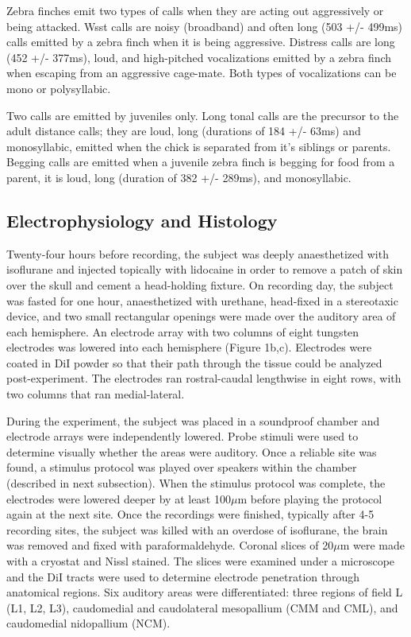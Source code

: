 Zebra finches emit two types of calls when they are acting out aggressively or being attacked. Wsst calls are noisy (broadband) and often long (503 +/- 499ms) calls emitted by a zebra finch when it is being aggressive. Distress calls are long (452 +/- 377ms), loud, and high-pitched vocalizations emitted by a zebra finch when escaping from an aggressive cage-mate. Both types of vocalizations can be mono or polysyllabic.

Two calls are emitted by juveniles only. Long tonal calls are the precursor to the adult distance calls; they are loud, long (durations of 184 +/- 63ms) and monosyllabic, emitted when the chick is separated from it’s siblings or parents. Begging calls are emitted when a juvenile zebra finch is begging for food from a parent, it is loud, long (duration of 382 +/- 289ms), and monosyllabic.


\subsection{Electrophysiology and Histology}

    Twenty-four hours before recording, the subject was deeply anaesthetized with isoflurane and injected topically with lidocaine in order to remove a patch of skin over the skull and cement a  head-holding fixture. On recording day, the subject was fasted for one hour, anaesthetized with urethane, head-fixed in a stereotaxic device, and two small rectangular openings were made over the auditory area of each hemisphere. An electrode array with two columns of eight tungsten electrodes was lowered into each hemisphere (Figure 1b,c). Electrodes were coated in DiI powder so that their path through the tissue could be analyzed post-experiment. The electrodes ran rostral-caudal lengthwise in eight rows, with two columns that ran medial-lateral.

    During the experiment, the subject was placed in a soundproof chamber and electrode arrays were independently lowered. Probe stimuli were used to determine visually whether the areas were auditory. Once a reliable site was found, a stimulus protocol was played over speakers within the chamber (described in next subsection). When the stimulus protocol was complete, the electrodes were lowered deeper by at least 100$\mu$m before playing the protocol again at the next site.
Once the recordings were finished, typically after 4-5 recording sites, the subject was killed with an overdose of isoflurane, the brain was removed and fixed with paraformaldehyde. Coronal slices of 20$\mu$m were made with a cryostat and Nissl stained. The slices were examined under a microscope and the DiI tracts were used to determine electrode penetration through anatomical regions. Six auditory areas were differentiated: three regions of field L (L1, L2, L3), caudomedial and caudolateral mesopallium (CMM and CML), and caudomedial nidopallium (NCM).


